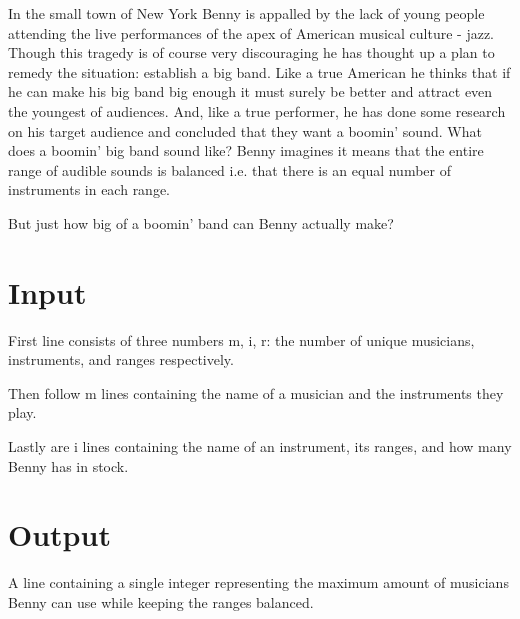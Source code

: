 
In the small town of New York Benny is appalled by the lack of young people attending the live performances of the apex of American musical culture - jazz. Though this tragedy is of course very discouraging he has thought up a plan to remedy the situation: establish a big band. Like a true American he thinks that if he can make his big band big enough it must surely be better and attract even the youngest of audiences. And, like a true performer, he has done some research on his target audience and concluded that they want a boomin' sound. What does a boomin' big band sound like? Benny imagines it means that the entire range of audible sounds is balanced i.e. that there is an equal number of instruments in each range.

But just how big of a boomin' band can Benny actually make?

\section*{Input}

First line consists of three numbers m, i, r: the number of unique musicians, instruments, and ranges respectively.

Then follow m lines containing the name of a musician and the instruments they play.

Lastly are i lines containing the name of an instrument, its ranges, and how many Benny has in stock.

\section*{Output}

A line containing a single integer representing the maximum amount of musicians Benny can use while keeping the ranges balanced.
